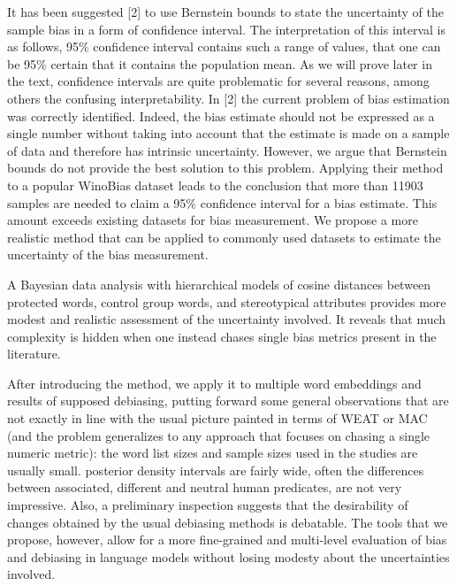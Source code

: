 \documentclass[
  12pt,
  dvipsnames,enabledeprecatedfontcommands]{scrartcl}
\begin{document}
It has been suggested {[}2{]} to use Bernstein bounds to state the
uncertainty of the sample bias in a form of confidence interval. The
interpretation of this interval is as follows, 95\% confidence interval
contains such a range of values, that one can be 95\% certain that it
contains the population mean. As we will prove later in the text,
confidence intervals are quite problematic for several reasons, among
others the confusing interpretability. In {[}2{]} the current problem of
bias estimation was correctly identified. Indeed, the bias estimate
should not be expressed as a single number without taking into account
that the estimate is made on a sample of data and therefore has
intrinsic uncertainty. However, we argue that Bernstein bounds do not
provide the best solution to this problem. Applying their method to a
popular WinoBias dataset leads to the conclusion that more than 11903
samples are needed to claim a 95\% confidence interval for a bias
estimate. This amount exceeds existing datasets for bias measurement. We
propose a more realistic method that can be applied to commonly used
datasets to estimate the uncertainty of the bias measurement.


A Bayesian data analysis with hierarchical models of cosine distances
between protected words, control group words, and stereotypical
attributes provides more modest and realistic assessment of the
uncertainty involved. It reveals that much complexity is hidden when one
instead chases single bias metrics present in the literature.

After introducing the method, we apply it to multiple word embeddings
and results of supposed debiasing, putting forward some general
observations that are not exactly in line with the usual picture painted
in terms of \textsf{WEAT} or \textsf{MAC} (and the problem generalizes
to any approach that focuses on chasing a single numeric metric): the
word list sizes and sample sizes used in the studies are usually small.
posterior density intervals are fairly wide, often the differences
between associated, different and neutral human predicates, are not very
impressive. Also, a preliminary inspection suggests that the
desirability of changes obtained by the usual debiasing methods is
debatable. The tools that we propose, however, allow for a more
fine-grained and multi-level evaluation of bias and debiasing in
language models without losing modesty about the uncertainties involved.

\newpage
\appendix
\end{document}
